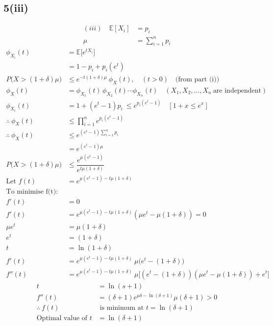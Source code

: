\documentclass[12pt]{article}
\begin{document}
\subsection{5(iii)}
\begin{align*}
(iii) \quad \mathbb{E}[X_i] &= p_i \\
\mu &= \sum_{i=1}^n p_i
\end{align*}
\begin{align*}
\phi_{X_i}(t) &= \mathbb{E}\big[e^{t X_i}\big] \\
&= 1 - p_i + p_i(e^t) \\
P\big(X > (1+\delta)\mu\big) &\leq e^{-t(1+\delta)\mu} \ \phi_X(t), \quad (t > 0) \quad \text{(from part (i))} \\
\phi_X(t) &= \phi_{X_1}(t) \, \phi_{X_2}(t) \cdots \phi_{X_n}(t) \quad (X_1, X_2, \dots, X_n \ \text{are independent}) \\
\phi_{X_i}(t) &= 1 + (e^t - 1)p_i \ \leq e^{p_i(e^t-1)} \quad [1+x \leq e^x] \\
\therefore \ \phi_X(t) &\leq \prod_{i=1}^n e^{p_i(e^t-1)} \\
\therefore \ \phi_X(t) &\leq  e^{(e^t-1)\sum_{i=1}^n p_i} \\
&= e^{(e^t - 1)\mu} \\
P\big(X > (1+\delta)\mu\big) &\leq \dfrac{e^{\mu(e^t-1)}}{e^{t\mu(1+\delta)}} \\
\text{Let } f(t) &= e^{\mu(e^t-1) - t\mu(1+\delta)} \\
\text{To minimise f(t): } \\ f'(t) &= 0 \\
f'(t) &= e^{\mu(e^t-1) - t\mu(1+\delta)} \left(\mu e^t - \mu(1+\delta)\right) = 0 \\
\mu e^t &= \mu(1+\delta) \\
e^t &= (1+\delta) \\
t &= \ln(1+\delta) \\
f'(t) &= e^{\mu(e^t-1) - t\mu(1+\delta)} \ \mu \big(e^t - (1+\delta)\big) \\
f''(t) &= e^{\mu(e^t-1) - t\mu(1+\delta)} \ \mu \Big[ (e^t - (1+\delta))(\mu e^t-\mu(1+\delta)) + e^t \Big]
\end{align*}
\begin{align*}
t &= \ln(s+1) \\
f''(t) &= (\delta+1) e^{\mu \delta - \ln(\delta+1)} \mu(\delta+1) > 0 \\
\therefore \ f(t) &\text{ is minimum at } t = \ln(\delta+1) \\
\text{Optimal value of } t &= \ln(\delta+1)
\end{align*}
\begin{center}
\end{center}
\end{document}
